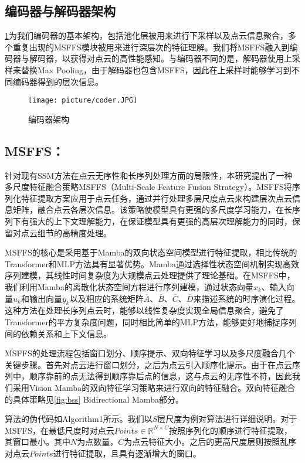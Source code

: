 \documentclass[preprint,12pt]{elsarticle}
\begin{document}
\subsection{编码器与解码器架构}
\cref{fig:coder}为我们编码器的基本架构，包括池化层被用来进行下采样以及点云信息聚合，多个重复出现的MSFFS模块被用来进行深层次的特征理解。我们将MSFFS融入到编码器与解码器，以获得对点云的高性能感知。与编码器不同的是，解码器使用上采样来替换Max Pooling，由于解码器也包含MSFFS，因此在上采样时能够学习到不同编码器得到的层次信息。

\begin{figure}[htbp]
	\centering
	\texttt{[image: picture/coder.JPG]}
	\caption{编码器架构}
	\label{fig:coder}
\end{figure}

\subsection{MSFFS：}
针对现有SSM方法在点云无序性和长序列处理方面的局限性，本研究提出了一种多尺度特征融合策略MSFFS（Multi-Scale Feature Fusion Strategy）。MSFFS将序列化特征提取方案应用于点云任务，通过并行处理多层尺度点云来构建层次点云信息矩阵，融合点云各层次信息。该策略使模型具有更强的多尺度学习能力，在长序列下有强大的上下文理解能力，在保证模型具有更强的高层次理解能力的同时，保留对点云细节的高精度处理。

MSFFS的核心是采用基于Mamba的双向状态空间模型进行特征提取，相比传统的Transformer和MLP方法具有显著优势。Mamba通过选择性状态空间机制实现高效序列建模，其线性时间复杂度为大规模点云处理提供了理论基础。在MSFFS中，我们利用Mamba的离散化状态空间方程进行序列建模，通过状态向量$x_k$、输入向量$u_k$和输出向量$y_k$以及相应的系统矩阵$\overline{A}$、$\overline{B}$、$\overline{C}$、$\overline{D}$来描述系统的时序演化过程。这种方法在处理长序列点云时，能够以线性复杂度实现全局信息聚合，避免了Transformer的平方复杂度问题，同时相比简单的MLP方法，能够更好地捕捉序列间的依赖关系和上下文信息。

MSFFS的处理流程包括窗口划分、顺序提示、双向特征学习以及多尺度融合几个关键步骤。首先对点云进行窗口划分，之后为点云引入顺序化提示。由于在点云序列中，顺序靠前的点无法得到顺序靠后点的信息，这与点云的无序性不符，因此我们采用Vision Mamba\cite{VisionMamba}的双向特征学习策略来进行双向的特征融合。双向特征融合的具体策略见\cref{fig:bss} Bidirectional Mamba部分。

算法的伪代码如Algorithm1所示。我们以$S$层尺度为例对算法进行详细说明。对于MSFFS，在最低尺度时对点云$Points\in\mathbb{R}^{N\times{C}}$按照序列化的顺序进行特征提取，其窗口最小。其中$N$为点数量，$C$为点云特征大小。之后的更高尺度层则按照乱序对点云$Points$进行特征提取，且具有逐渐增大的窗口。
\end{document}
